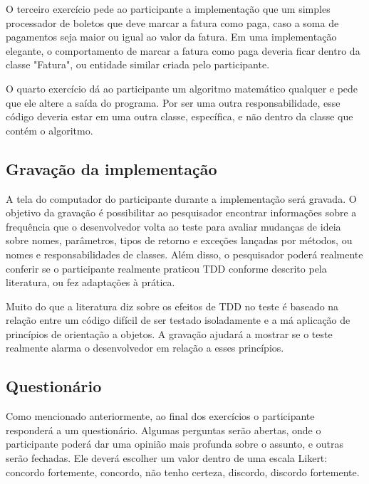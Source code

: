 O terceiro exercício pede ao participante a implementação que um simples processador de boletos que
deve marcar a fatura como paga, caso a soma de pagamentos seja maior ou igual ao valor da fatura. 
Em uma implementação elegante, o comportamento de marcar a fatura como paga deveria ficar dentro
da classe "Fatura", ou entidade similar criada pelo participante.

O quarto exercício dá ao participante um algoritmo matemático qualquer e pede que ele altere a saída
do programa. Por ser uma outra responsabilidade, esse código deveria estar em uma outra classe, específica,
e não dentro da classe que contém o algoritmo.

\subsection{Gravação da implementação}
\label{sec:planejamento-gravacao}

A tela do computador do participante durante a implementação será gravada. 
O objetivo da gravação é possibilitar ao pesquisador encontrar informações
sobre a frequência que o desenvolvedor volta ao teste para avaliar mudanças de ideia sobre
nomes, parâmetros, tipos de retorno e exceções lançadas por métodos, ou nomes
e responsabilidades de classes. Além disso, o pesquisador poderá realmente
conferir se o participante realmente praticou TDD conforme descrito pela
literatura, ou fez adaptações à prática.

Muito do que a literatura diz sobre os efeitos de TDD no teste é baseado
na relação entre um código difícil de ser testado isoladamente e a má aplicação
de princípios de orientação a objetos. A gravação ajudará a mostrar se o teste
realmente alarma o desenvolvedor em relação a esses princípios.

\subsection{Questionário}
\label{sec:questionario}

Como mencionado anteriormente, ao final dos exercícios o participante responderá a um questionário.
Algumas
perguntas serão abertas, onde o participante poderá dar uma opinião mais profunda sobre o assunto,
e outras serão fechadas. Ele deverá escolher um valor dentro de uma escala
Likert: concordo fortemente, concordo, não tenho certeza,
discordo, discordo fortemente.

